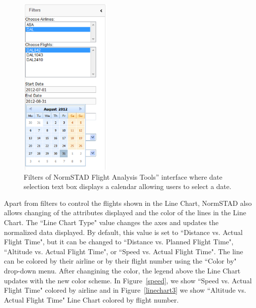 \documentclass{sig-alternate}
\begin{document}
\begin{figure}
\centering
\includegraphics[height=3.5in]{figs/calendar.eps}
\caption{
	Filters of NormSTAD Flight Analysis Tools'' interface where date selection text box
displays a calendar allowing users to select a date.
}
\label{calendar}
\end{figure}

Apart from filters to control the flights shown in the Line Chart, NormSTAD also allows changing
of the attributes displayed and the color of the lines in the Line Chart. The ``Line Chart Type"
value changes the axes and updates the normalized data displayed. By default, this value
is set to ``Distance vs. Actual Flight Time", but it can be changed to ``Distance
vs. Planned Flight Time", ``Altitude vs. Actual Flight Time", or ``Speed vs. Actual Flight Time". 
The line can be colored by their airline or by their flight number using the ``Color by" drop-down
menu. After changining the color, the legend above the Line Chart updates with the new 
color scheme. In Figure~\ref{speed}, we show ``Speed vs. Actual Flight Time" colored by
airline and in
Figure~\ref{linechart3} we show
``Altitude vs. Actual Flight Time" Line Chart colored by flight number. 
\end{document}
